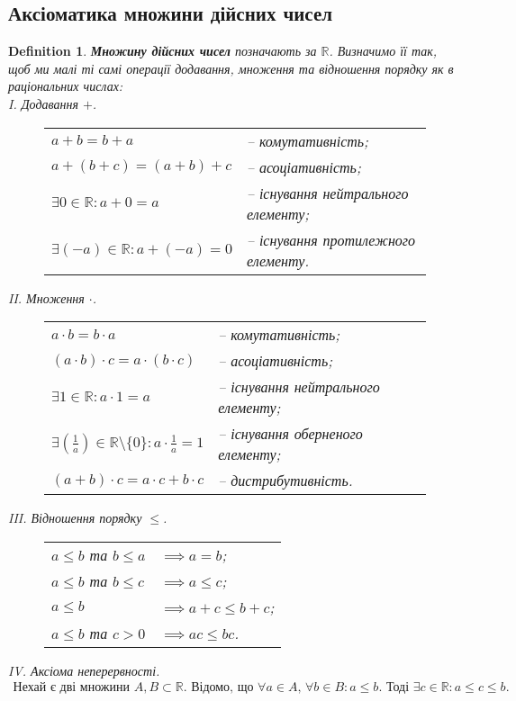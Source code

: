 \documentclass[a4paper, 14pt]{article}
\theoremstyle{theoremdd}
\theoremstyle{theoremdd}
\newtheorem{definition}[theorem]{Definition}
\theoremstyle{theoremdd}
\theoremstyle{theoremdd}
\theoremstyle{theoremdd}
\theoremstyle{theoremdd}
\theoremstyle{theoremdd}
\theoremstyle{theoremdd}
\begin{document}
	\subsection{Аксіоматика множини дійсних чисел}
	\begin{definition}
	\textbf{Множину дійсних чисел} позначають за $\mathbb{R}$. Визначимо її так, щоб ми малі ті самі операції додавання, множення та відношення порядку як в раціональних числах:\\
	I. Додавання $+$.
	\begin{figure}[H]
	\centering
	\begin{tabular}{ll}
	$a+b=b+a$ & -- комутативність;\\
	$a+(b+c)=(a+b)+c$ & -- асоціативність;\\
	$\exists 0 \in\mathbb{R}: a+0=a$ & -- існування нейтрального елементу;\\
	$\exists (-a) \in\mathbb{R}: a+(-a)=0$ & -- існування протилежного елементу.
	\end{tabular}
	\end{figure}
	II. Множення $\cdot$.
	\begin{figure}[H]
	\centering
	\begin{tabular}{ll}
	$a \cdot b=b \cdot a$ & -- комутативність;\\
	$(a \cdot b) \cdot c=a \cdot (b \cdot c)$ & -- асоціативність;\\
	$\exists 1 \in\mathbb{R}: a \cdot 1=a$ & -- існування нейтрального елементу;\\
	$\displaystyle \exists \left(\frac{1}{a}\right) \in\mathbb{R} \setminus \{0\}: a \cdot \frac{1}{a}=1$ & -- існування оберненого елементу;\\
	$(a+b) \cdot c = a \cdot c + b \cdot c$ & -- дистрибутивність.
	\end{tabular}
	\end{figure}
	III. Відношення порядку $\leq$.
	\begin{figure}[H]
	\centering
	\begin{tabular}{ll}
	$a \leq b$ та $b \leq a$ & $\implies a = b$;\\
	$a \leq b$ та $b \leq c$ & $\implies a \leq c$;\\
	$a \leq b$ & $\implies a+c \leq b+c$;\\
	$a \leq b$ та $c>0$ & $\implies ac \leq bc$.
	\end{tabular}
	\end{figure}
	IV. Аксіома неперервності.
	\begin{align*}
	\text{Нехай є дві множини $A,B \subset \mathbb{R}$. Відомо, що $\forall a \in A$, $\forall b \in B: a \leq b$. Тоді $\exists c \in \mathbb{R}: a \leq c \leq b$.}
	\end{align*}
	\end{definition}
	
\end{document}
